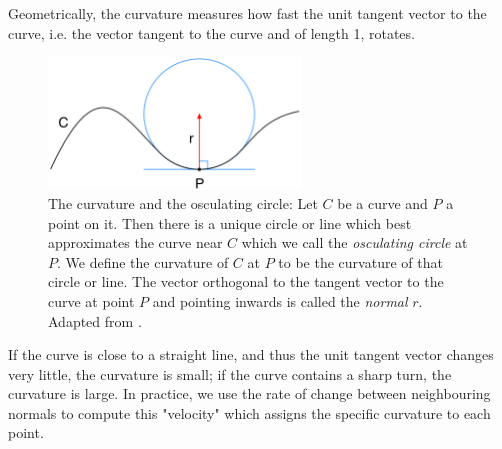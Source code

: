 
Geometrically, the curvature measures how fast the unit tangent vector to the curve, i.e. the vector tangent to the curve and of length 1, rotates. 

\begin{figure}[H]
	\centering
	\includegraphics[width=0.6\textwidth]{../Figures/curveCircle.png}
	\caption{The curvature and the osculating circle: Let \( C \) be a curve and \( P \) a point on it. Then there is a unique circle or line which best approximates the curve near \( C \) which we call the \textit{osculating circle} at \( P \). We define the curvature of \( C \) at \( P \) to be the curvature of that circle or line. The vector orthogonal to the tangent vector to the curve at point \( P \) and pointing inwards is called the \textit{normal} \(r\). Adapted from \cite{osculatingCircle}.
		}
	\label{fig:curveCircle}
\end{figure}

If the curve is close to a straight line, and thus the unit tangent vector changes very little, the curvature is small; if the curve contains a sharp turn, the curvature is large.
In practice, we use the rate of change between neighbouring normals to compute this "velocity" which assigns the specific curvature to each point.


